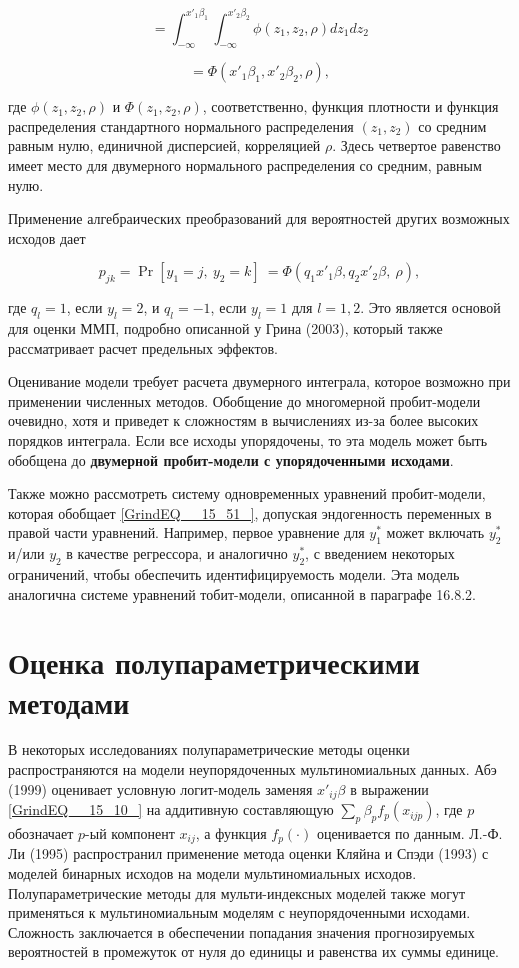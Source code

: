 \[=\int^{x'_1{\beta }_1}_{-\infty }{\int^{x'_2{\beta }_2}_{-\infty }{ \phi \left(z_1,z_2,\rho \right)dz_1dz_2}}\] 

\[=\Phi \left(x'_1{\beta }_1,x'_2{\beta }_2,\rho \right),\] 

где $\phi \left(z_1,z_2,\rho \right)$ и $\Phi \left(z_1,z_2,\rho \right)$, соответственно, функция плотности и функция распределения стандартного нормального распределения $(z_1,z_2)$ со средним равным нулю, единичной дисперсией, корреляцией $\rho $. Здесь четвертое равенство имеет место для двумерного нормального распределения со средним, равным нулю.

Применение алгебраических преобразований для вероятностей других возможных исходов дает 

\[p_{jk}={\Pr  \left[y_1=j,\ y_2=k\right]\ }=\Phi \left(q_1x'_1\beta ,q_2x'_2\beta ,\ \rho \right),\] 

где $q_l=1$, если $y_l=2$, и $q_l=-1$, если $y_l=1$ для $l=1,2$. Это является основой для оценки ММП, подробно описанной у Грина (2003), который также рассматривает расчет предельных эффектов.

Оценивание модели требует расчета двумерного интеграла, которое возможно при применении численных методов. Обобщение до многомерной пробит-модели очевидно, хотя и приведет к сложностям в вычислениях из-за более высоких порядков интеграла. Если все исходы упорядочены, то эта модель может быть обобщена до \textbf{двумерной пробит-модели с упорядоченными исходами}.

Также можно рассмотреть систему одновременных уравнений пробит-модели, которая обобщает \eqref{GrindEQ__15_51_}, допуская эндогенность переменных в правой части уравнений. Например, первое уравнение для $y^*_1$ может включать $y^*_2$ и/или $y_2$ в качестве регрессора, и аналогично $y^*_2$, с введением некоторых ограничений, чтобы обеспечить идентифицируемость модели. Эта модель аналогична системе уравнений тобит-модели, описанной в параграфе 16.8.2.

\section{ Оценка полупараметрическими методами}

В некоторых исследованиях полупараметрические методы оценки распространяются на модели неупорядоченных мультиномиальных данных. Абэ (1999) оценивает условную логит-модель заменяя $x'_{ij}\beta $ в выражении \eqref{GrindEQ__15_10_} на аддитивную составляющую $\sum_p{{\beta }_pf_p(x_{ijp})}$, где $p$ обозначает $p$-ый компонент $x_{ij}$, а функция $f_p(\cdot )$ оценивается по данным. Л.-Ф. Ли (1995) распространил применение метода оценки Кляйна и Спэди (1993) с моделей бинарных исходов на модели мультиномиальных исходов. Полупараметрические методы для мульти-индексных моделей также могут применяться к мультиномиальным моделям с неупорядоченными исходами. Сложность заключается в обеспечении попадания значения прогнозируемых вероятностей в промежуток от нуля до единицы и равенства их суммы единице.

